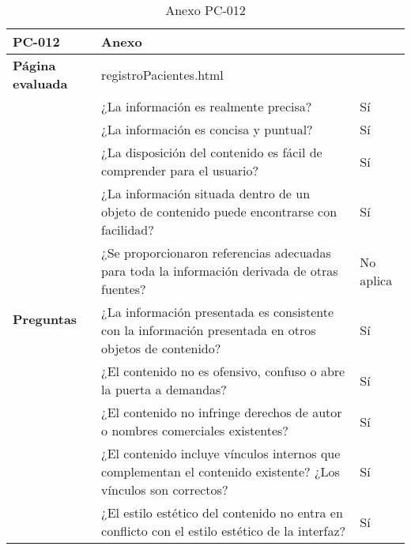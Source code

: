 \begin{table}[htpb]
\centering
\begin{tabularx}{\textwidth}{|l|X|l|}
\hline
\rowcolor[gray]{0.9}\textbf{PC-012}                       & \multicolumn{2}{l|}{Anexo}                                                                                                \\ \hline
\textbf{Página evaluada}             & \multicolumn{2}{l|}{registroPacientes.html}                                                                               \\ \hline
\multirow{10}{*}{\textbf{Preguntas}} & ¿La información es realmente precisa?                                                                         & Sí        \\ \cline{2-3} 
                                     & ¿La información es concisa y puntual?                                                                         & Sí        \\ \cline{2-3} 
                                     & ¿La disposición del contenido es fácil de comprender para el usuario?                                         & Sí        \\ \cline{2-3} 
                                     & ¿La información situada dentro de un objeto de contenido puede encontrarse con facilidad?                     & Sí        \\ \cline{2-3} 
                                     & ¿Se proporcionaron referencias adecuadas para toda la información derivada de otras fuentes?                  & No aplica \\ \cline{2-3} 
                                     & ¿La información presentada es consistente con la información presentada en otros objetos de contenido?        & Sí        \\ \cline{2-3} 
                                     & ¿El contenido no es ofensivo, confuso o abre la puerta a demandas?                                            & Sí        \\ \cline{2-3} 
                                     & ¿El contenido no infringe derechos de autor o nombres comerciales existentes?                                 & Sí        \\ \cline{2-3} 
                                     & ¿El contenido incluye vínculos internos que complementan el contenido existente? ¿Los vínculos son correctos? & Sí        \\ \cline{2-3} 
                                     & ¿El estilo estético del contenido no entra en conflicto con el estilo estético de la interfaz?                & Sí        \\ \hline
\end{tabularx}
\caption{Anexo PC-012}
\end{table}


